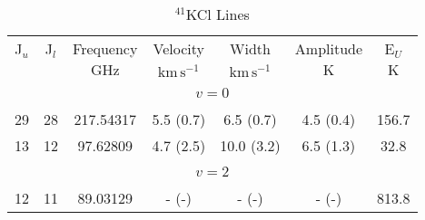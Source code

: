\begin{table*}[htp]
\centering
\caption{$^{41}$KCl Lines}
\begin{tabular}{ccccccc}
\label{tab:41KCl_salt_lines}
 J$_u$ & J$_l$ & Frequency & Velocity & Width & Amplitude & E$_U$ \\
  &  & $\mathrm{GHz}$ & $\mathrm{km\,s^{-1}}$ & $\mathrm{km\,s^{-1}}$ & $\mathrm{K}$ & $\mathrm{K}$ \\
\hline
&\vspace{-0.75em}\\
\multicolumn{7}{c}{$v = 0$} \\
\vspace{-0.75em}\\
 29 & 28 & 217.54317 & 5.5 (0.7) & 6.5 (0.7) & 4.5 (0.4) & 156.7 \\
 13 & 12 & 97.62809 & 4.7 (2.5) & 10.0 (3.2) & 6.5 (1.3) & 32.8 \\
\hline
&\vspace{-0.75em}\\
\multicolumn{7}{c}{$v = 2$} \\
\vspace{-0.75em}\\
 12 & 11 & 89.03129 & - (-) & - (-) & - (-) & 813.8 \\
\end{tabular}

\par 
\end{table*}
